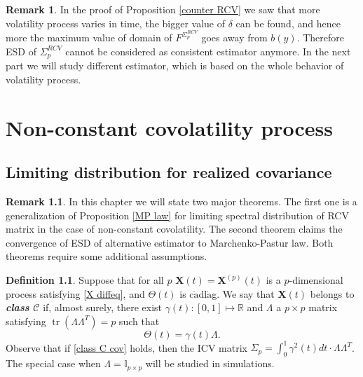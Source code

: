 \documentclass[a4paper,11pt]{book}
\theoremstyle{plain}
\theoremstyle{definition}
\newtheorem{defn}[thm]{Definition}
\newtheorem{rmrk}[thm]{Remark}
\newcommand{\MR}{\mathbb{R}}
\newcommand{\tr}{\operatorname{tr}}
\newcommand{\define}[1]{\textit{\textbf{#1}}}
\begin{document}
    \begin{rmrk}
    	In the proof of Proposition \ref{counter RCV} we saw that more volatility process varies in time, the bigger value of $\delta$ can be found, and hence more the maximum value of domain of $F^{\Sigma_p^{RCV}}$ goes away from $b(y)$. Therefore ESD of $\Sigma_p^{RCV}$ cannot be considered as consistent estimator anymore. In the next part we will study different estimator, which is based on the whole behavior of volatility process.
    \end{rmrk}
    
    \chapter{Non-constant covolatility process}
    
    \section{Limiting distribution for realized covariance}
    \begin{rmrk}
    	In this chapter we will state two major theorems. The first one is a generalization of Proposition \ref{MP law} for limiting spectral distribution of RCV matrix in the case of non-constant covolatility. The second theorem claims the convergence of ESD of alternative estimator to Marchenko-Pastur law. Both theorems require some additional assumptions.
    \end{rmrk}
    
    
    \begin{defn}
    	Suppose that for all $p$ $\mathbf{X}(t) = \mathbf{X}^{(p)}(t)$ is a $p$-dimensional process satisfying \eqref{X diffeq}, and $\Theta(t)$ is c$\grave{\text{a}}$dl$\grave{\text{a}}$g. We say that $\mathbf{X}(t)$ belongs to \define{class $\mathcal{C}$} if, almost surely, there exist $\gamma(t): [0, 1] \mapsto \MR$ and $\Lambda$ a $p \times p$ matrix satisfying $\tr(\Lambda \Lambda^T) = p$ such that 
    	\begin{equation} \label{class C cov}
    	\Theta(t) = \gamma(t) \Lambda.
    	\end{equation}
    	Observe that if \eqref{class C cov} holds, then the ICV matrix $\Sigma_p = \int_{0}^{1} \gamma^2(t) dt \cdot \Lambda \Lambda^T$. The special case when $\Lambda = \mathbb{I}_{p \times p}$ will be studied in simulations.
    \end{defn}
    
\end{document}
